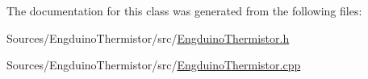 The documentation for this class was generated from the following files\+:\begin{DoxyCompactItemize}
\item 
Sources/\+Engduino\+Thermistor/src/\hyperlink{_engduino_thermistor_8h}{Engduino\+Thermistor.\+h}\item 
Sources/\+Engduino\+Thermistor/src/\hyperlink{_engduino_thermistor_8cpp}{Engduino\+Thermistor.\+cpp}\end{DoxyCompactItemize}
